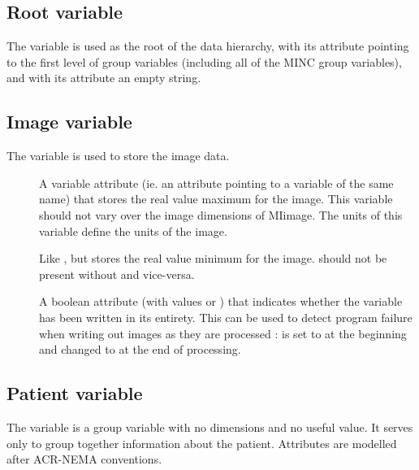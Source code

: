 \subsection{Root variable}

The variable  is used as the root of the data
hierarchy, with its  attribute pointing to the first
level of group variables (including all of the MINC group variables),
and with its  attribute an empty string.

\subsection{Image variable}

The variable  is used to store the image data. 

\begin{description}
   \item [] A variable attribute (ie. an attribute
      pointing to a variable of the same name) that stores the real
      value maximum for the image. This variable should not vary over
      the image dimensions of MIimage. The units of this variable
      define the units of the image.
   \item [] Like , but stores the
      real value minimum for the image.  should not
      be present without  and vice-versa.
   \item [] A boolean attribute (with values
       or ) that indicates whether the variable
      has been written in its entirety. This can be used to detect
      program failure when writing out images as they are processed :
       is set to  at the beginning and
      changed to  at the end of processing.
\end{description}

\subsection{Patient variable}

The variable  is a group variable with no dimensions
and no useful value. It serves only to group together information
about the patient. Attributes are modelled after ACR-NEMA conventions.

